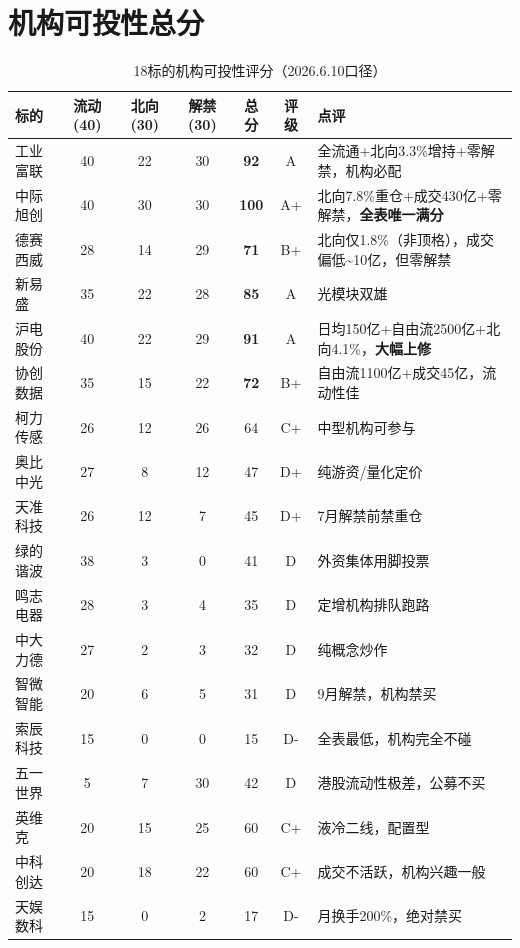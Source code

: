 \section{机构可投性总分}

\begin{table}[H]
\centering\scriptsize
\renewcommand{\arraystretch}{1.2}
\begin{tabularx}{\textwidth}{l c c c c c X}
\toprule
\textbf{标的} & \textbf{流动(40)} & \textbf{北向(30)} & \textbf{解禁(30)} & \textbf{总分} & \textbf{评级} & \textbf{点评} \\
\midrule
工业富联 & 40 & 22 & 30 & \textbf{92} & \textcolor{riskgreen}{A} & 全流通+北向3.3\%增持+零解禁，机构必配 \\
中际旭创 & 40 & 30 & 30 & \textbf{100} & \textcolor{riskgreen}{A+} & 北向7.8\%重仓+成交430亿+零解禁，\textbf{全表唯一满分} \\
德赛西威 & 28 & 14 & 29 & \textbf{71} & B+ & 北向仅1.8\%（非顶格），成交偏低\textasciitilde10亿，但零解禁 \\
新易盛 & 35 & 22 & 28 & \textbf{85} & \textcolor{riskgreen}{A} & 光模块双雄 \\
沪电股份 & 40 & 22 & 29 & \textbf{91} & \textcolor{riskgreen}{A} & 日均150亿+自由流2500亿+北向4.1\%，\textbf{大幅上修} \\
协创数据 & 35 & 15 & 22 & \textbf{72} & B+ & 自由流1100亿+成交45亿，流动性佳 \\
柯力传感 & 26 & 12 & 26 & 64 & C+ & 中型机构可参与 \\
奥比中光 & 27 & 8 & 12 & 47 & \textcolor{riskred}{D+} & 纯游资/量化定价 \\
天准科技 & 26 & 12 & 7 & 45 & \textcolor{riskred}{D+} & 7月解禁前禁重仓 \\
绿的谐波 & 38 & 3 & 0 & 41 & \textcolor{riskred}{D} & 外资集体用脚投票 \\
鸣志电器 & 28 & 3 & 4 & 35 & \textcolor{riskred}{D} & 定增机构排队跑路 \\
中大力德 & 27 & 2 & 3 & 32 & \textcolor{riskred}{D} & 纯概念炒作 \\
智微智能 & 20 & 6 & 5 & 31 & \textcolor{riskred}{D} & 9月解禁，机构禁买 \\
索辰科技 & 15 & 0 & 0 & 15 & \textcolor{riskred}{D-} & 全表最低，机构完全不碰 \\
五一世界 & 5 & 7 & 30 & 42 & \textcolor{riskred}{D} & 港股流动性极差，公募不买 \\
英维克 & 20 & 15 & 25 & 60 & C+ & 液冷二线，配置型 \\
中科创达 & 20 & 18 & 22 & 60 & C+ & 成交不活跃，机构兴趣一般 \\
天娱数科 & 15 & 0 & 2 & 17 & \textcolor{riskred}{D-} & 月换手200\%，绝对禁买 \\
\bottomrule
\end{tabularx}
\caption{18标的机构可投性评分（2026.6.10口径）}
\end{table}

